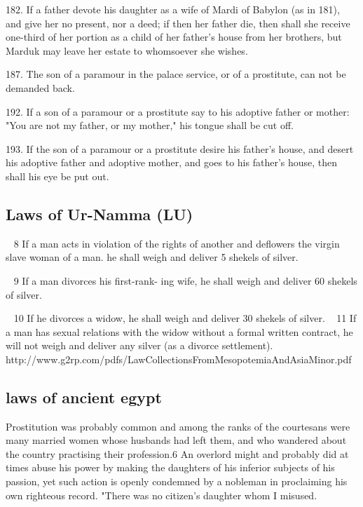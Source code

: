 \documentclass[11pt]{article}
\begin{document}
182. If a father devote his daughter as a wife of Mardi of Babylon (as in 181), and give her no present, nor a deed; if then her father die, then shall she receive one-third of her portion as a child of her father's house from her brothers, but Marduk may leave her estate to whomsoever she wishes.

187. The son of a paramour in the palace service, or of a prostitute, can not be demanded back.

192. If a son of a paramour or a prostitute say to his adoptive father or mother: "You are not my father, or my mother," his tongue shall be cut off.

193. If the son of a paramour or a prostitute desire his father's house, and desert his adoptive father and adoptive mother, and goes to his father's house, then shall his eye be put out.








\subsection{Laws of Ur-Namma (LU) }

~ 8 If a man acts in violation of the
rights of another and deflowers the
virgin slave woman of a man. he
shall weigh and deliver 5 shekels of
silver.

~ 9 If a man divorces his first-rank-
ing wife, he shall weigh and deliver
60 shekels of silver.



~ 10 If he divorces a widow, he shall
weigh and deliver 30 shekels of silver.
~ 11 If a man has sexual relations
with the widow without a formal
written contract, he will not weigh
and deliver any silver (as a divorce
settlement).
http://www.g2rp.com/pdfs/LawCollectionsFromMesopotemiaAndAsiaMinor.pdf



\subsection{laws of ancient egypt}

Prostitution was probably common and among the
ranks of the courtesans were many married women whose husbands had
left them, and who wandered about the country practising their profession.6 An overlord might and probably did at times abuse his power by
making the daughters of his inferior subjects of his passion, yet such action is openly condemned by a nobleman in proclaiming his own righteous record. "There was no citizen's daughter whom I misused.
\end{document}
